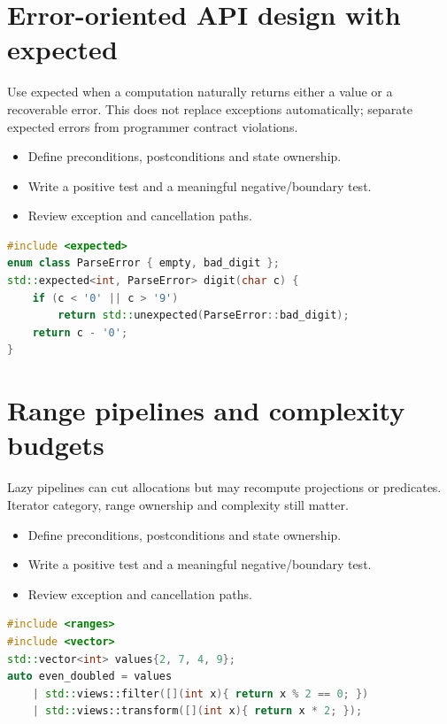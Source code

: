 \documentclass[11pt]{article}
\begin{document}
\section{Error-oriented API design with expected}
Use expected when a computation naturally returns either a value or a recoverable error. This does not replace exceptions automatically; separate expected errors from programmer contract violations.

\begin{itemize}[leftmargin=*,itemsep=1pt,topsep=3pt]
\item Define preconditions, postconditions and state ownership.
\item Write a positive test and a meaningful negative/boundary test.
\item Review exception and cancellation paths.
\end{itemize}
\begin{lstlisting}[language=C++]
#include <expected>
enum class ParseError { empty, bad_digit };
std::expected<int, ParseError> digit(char c) {
    if (c < '0' || c > '9')
        return std::unexpected(ParseError::bad_digit);
    return c - '0';
}
\end{lstlisting}
\section{Range pipelines and complexity budgets}
Lazy pipelines can cut allocations but may recompute projections or predicates. Iterator category, range ownership and complexity still matter.

\begin{itemize}[leftmargin=*,itemsep=1pt,topsep=3pt]
\item Define preconditions, postconditions and state ownership.
\item Write a positive test and a meaningful negative/boundary test.
\item Review exception and cancellation paths.
\end{itemize}
\begin{lstlisting}[language=C++]
#include <ranges>
#include <vector>
std::vector<int> values{2, 7, 4, 9};
auto even_doubled = values
    | std::views::filter([](int x){ return x % 2 == 0; })
    | std::views::transform([](int x){ return x * 2; });
\end{lstlisting}
\end{document}
